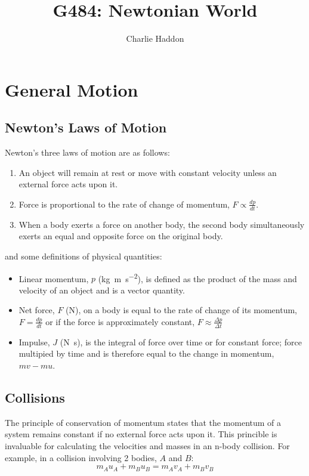 \documentclass[a4,8pt]{article} \usepackage[margin=3cm,includefoot]{geometry}
\title{G484: Newtonian World} \author{Charlie Haddon}
\begin{document}
\begin{titlepage}
	\pagenumbering{} \maketitle
	\vspace{15cm}
\end{titlepage}
\clearpage


\section{General Motion}

\subsection{Newton's Laws of Motion}

Newton's three laws of motion are as follows:
\begin{enumerate}
	\item An object will remain at rest or move with constant velocity
          unless an external force acts upon it.
	\item Force is proportional to the rate of change of momentum, $F
          \propto \frac{dp}{dt}$.
	\item When a body exerts a force on another body, the second body
          simultaneously exerts an equal and opposite force on the original
          body.
\end{enumerate}


and some definitions of physical quantities:
\begin{itemize}
	\item Linear momentum, $p$ (\si{\kilo\gram\metre\per\square\second}), is
          defined as the product of the mass and velocity of an object and is a
          vector quantity.
	\item Net force, $F$ (\si{\newton}), on a body is equal to the rate of
          change of its momentum, $F=\frac{dp}{dt}$ or if the force is
          approximately constant, $F \approx \frac{\Delta p}{\Delta t}$
	\item Impulse, $J$ (\si{\newton\second}), is the integral of force over
          time or for constant force; force multipied by time and is therefore
          equal to the change in momentum, $mv-mu$.
\end{itemize}


\subsection{Collisions}
The principle of conservation of momentum states that the momentum of a system
remains constant if no external force acts upon it. This princible is invaluable
for calculating the velocities and masses in an n-body collision. For example,
in a collision involving 2 bodies, $A$ and $B$:
$$m_A u_A + m_B u_B = m_A v_A + m_B v_B$$
\end{document}
